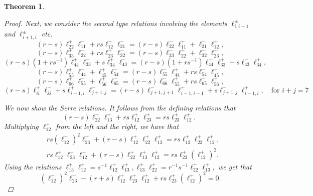 \documentclass[10pt,a4paper]{amsart}
\newtheorem{theorem}{Theorem}
\numberwithin{equation}{section}
\begin{document}
\begin{theorem}
\begin{proof}
Next, we consider the second type relations involving the elements $\ell^{\pm}_{i,i+1}$ and $\ell^{\pm}_{i+1,i}$ etc.
$$
(r-s) \ell_{22}^{+} \ell_{11}^{-}+r s \ell_{12}^{+} \ell_{21}^{-}=(r-s) \ell_{22}^{-} \ell_{11}^{+}+\ell_{21}^{-} \ell_{12}^{+},
$$
$$
(r-s) \ell_{33}^{+} \ell_{22}^{-}+r s \ell_{23}^{+} \ell_{32}^{-}=(r-s) \ell_{33}^{-} \ell_{22}^{+}+\ell_{32}^{-} \ell_{23}^{+},
$$
$$
(r-s)\left(1+r s^{-1}\right) \ell_{44}^{+} \ell_{33}^{-}+s \ell_{34}^{+} \ell_{43}^{-}=(r-s)\left(1+r s^{-1}\right) \ell_{44}^{-} \ell_{33}^{+}+s \ell_{43}^{-} \ell_{34}^{+},
$$
$$
(r-s) \ell_{55}^{+} \ell_{44}^{-}+\ell_{45}^{+} \ell_{54}^{-}=(r-s) \ell_{55}^{-} \ell_{44}^{+}+r s \ell_{54}^{-} \ell_{45}^{+},
$$
$$
(r-s) \ell_{66}^{+} \ell_{55}^{-}+\ell_{56}^{+} \ell_{65}^{-}=(r-s) \ell_{66}^{-} \ell_{55}^{+}+r s \ell_{65}^{-} \ell_{56}^{+} ,
$$
$$
(r-s) \ell_{i i}^{+} \ell_{j j}^{-}+s \ell_{i-1, i}^{+} \ell_{j+1, j}^{-}=(r-s) \ell_{j+1, j+1}^{-} \ell_{i-1, i-1}^{+}+s \ell_{j+1, j}^{-} \ell_{i-1, i}^{+}, \quad\text {for } i+j=7
$$

We now show the Serre relations. It follows from the defining relations that
 $$
 (r-s) \ell_{22}^{+} \ell_{13}^{+}+r s \ell_{12}^{+} \ell_{23}^{+}=r s \ell_{23}^{+} \ell_{12}^{+} \text {. }
 $$
 Multiplying $\ell_{12}^{+}$ from the left and the right, we have that
 $$
 \begin{aligned}
 	& r s\left(\ell_{12}^{+}\right)^2 \ell_{23}^{+}+(r-s) \ell_{12}^{+} \ell_{22}^{+} \ell_{13}^{+}=r s \ell_{12}^{+} \ell_{23}^{+} \ell_{12}^{+}, \\
 	& r s \ell_{12}^{+} \ell_{23}^{+} \ell_{12}^{+}+(r-s) \ell_{22}^{+} \ell_{13}^{+} \ell_{12}^{+}=r s \ell_{23}^{+}\left(\ell_{12}^{+}\right)^2 ,
 \end{aligned}
 $$
 Using the relations
 $
 \ell_{13}^{+} \ell_{12}^{+}=s^{-1} \ell_{12}^{+} \ell_{13}^{+}, \ell_{13}^{+} \ell_{22}^{+}=r^{-1} s^{-1} \ell_{22}^{+} \ell_{13}^{+} ,
 $
 we get that
 $$
 \left(\ell_{12}^{+}\right)^2 \ell_{23}^{+}-(r+s) \ell_{12}^{+} \ell_{23}^{+} \ell_{12}^{+}+r s \ell_{23}^{+}\left(\ell_{12}^{+}\right)^2=0.
 $$


\end{proof}
\end{theorem}
\end{document}
